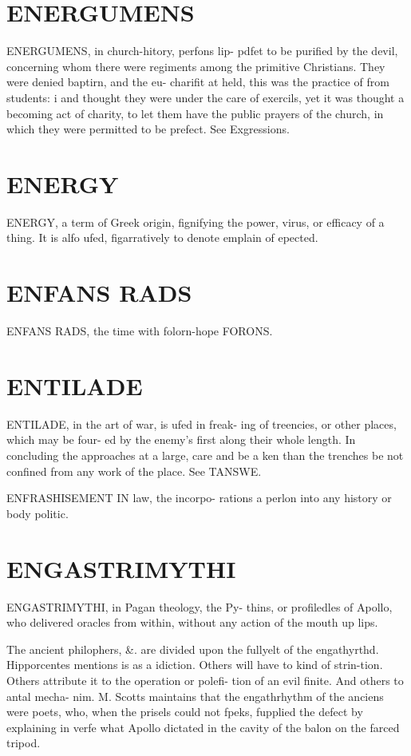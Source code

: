 \documentclass{article}
\begin{document}
\section*{ENERGUMENS}
ENERGUMENS, in church-hitory, perfons lip- pdfet to be purified by the devil, concerning whom there were regiments among the primitive Christians. They were denied baptirn, and the eu- charifit at held, this was the practice of from students: i and thought they were under the care of exercils, yet it was thought a becoming act of charity, to let them have the public prayers of the church, in which they were permitted to be prefect. See Exgressions.

\section*{ENERGY}
ENERGY, a term of Greek origin, fignifying the power, virus, or efficacy of a thing. It is alfo ufed, figarratively to denote emplain of epected.

\section*{ENFANS RADS}
ENFANS RADS, the time with folorn-hope FORONS.

\section*{ENTILADE}
ENTILADE, in the art of war, is ufed in freak- ing of treencies, or other places, which may be four- ed by the enemy’s first along their whole length. In concluding the approaches at a large, care and be a ken than the trenches be not confined from any work of the place. See TANSWE.

ENFRASHISEMENT IN law, the incorpo- rations a perlon into any history or body politic.

\section*{ENGASTRIMYTHI}
ENGASTRIMYTHI, in Pagan theology, the Py- thins, or profiledles of Apollo, who delivered oracles from within, without any action of the mouth up lips.

The ancient philophers, \&. are divided upon the fullyelt of the engathyrthd. Hipporcentes mentions is as a idiction. Others will have to kind of strin-tion. Others attribute it to the operation or polefi- tion of an evil finite. And others to antal mecha- nim. M. Scotts maintains that the engathrhythm of the anciens were poets, who, when the prisels could not fpeks, fupplied the defect by explaining in verfe what Apollo dictated in the cavity of the balon on the farced tripod.
\end{document}
